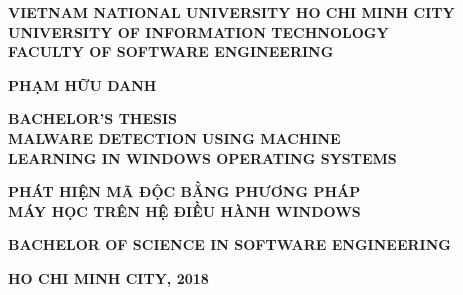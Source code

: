 %
\begin{titlepage}

\begin{changemargin}{-35mm}{-20mm}

\begin{center}
  
\textbf{\large VIETNAM NATIONAL UNIVERSITY HO CHI MINH CITY} \\[2mm]
\textbf{\Large UNIVERSITY OF INFORMATION TECHNOLOGY} \\ [2mm]
\textbf{\Large FACULTY OF SOFTWARE ENGINEERING}

\vspace{0.1\textheight}
\begin{otherlanguage}{vietnamese}
\textbf{\large PHẠM HỮU DANH}
\end{otherlanguage}

\vspace{0.1\textheight}
\textbf{\Large BACHELOR’S THESIS} \\ [10mm]

\textbf{\Large MALWARE DETECTION USING MACHINE } \\ [2mm]
\textbf{\Large LEARNING IN WINDOWS OPERATING SYSTEMS } \\ [10mm]

\begin{otherlanguage}{vietnamese}
\textbf{ \Large PHÁT HIỆN MÃ ĐỘC BẰNG PHƯƠNG PHÁP } \\ [2mm]
\textbf{ \Large MÁY HỌC TRÊN HỆ ĐIỀU HÀNH WINDOWS }
\end{otherlanguage}

\vspace{0.15\textheight}

\textbf{\large BACHELOR OF SCIENCE IN SOFTWARE ENGINEERING}

\vspace{\fill}
\textbf{\large HO CHI MINH CITY, 2018}
\end{center}

\end{changemargin}
\end{titlepage}
\cleardoublepage
